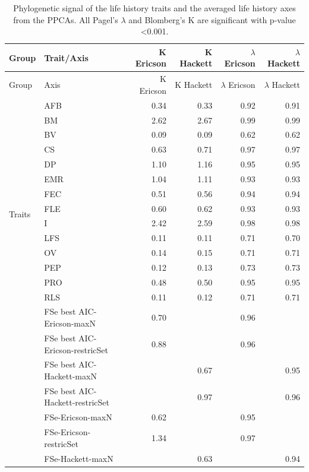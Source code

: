 \clearpage%
\begin{footnotesize}
\begin{longtable}{@{}ll|rr|rr@{}}
\caption[Phylogenetic signal]{
Phylogenetic signal of the life history traits and the averaged life history
axes from the PPCAs. All Pagel's $\lambda$ and Blomberg's K are significant with
p-value \textless{0.001}.}
\label{tab:tabApp2.7}\\

\toprule
Group & Trait/Axis & K Ericson & K Hackett & $\lambda$ Ericson & $\lambda$ Hackett\\
\midrule
\endfirsthead
\toprule
Group & Axis & K Ericson & K Hackett & $\lambda$ Ericson & $\lambda$ Hackett\\
\midrule
\endhead
\multirow{15}{*}{Traits} & AFB & 0.34 & 0.33 & 0.92 & 0.91\\
 & BM & 2.62 & 2.67 & 0.99 & 0.99\\
 & BV & 0.09 & 0.09 & 0.62 & 0.62\\
 & CS & 0.63 & 0.71 & 0.97 & 0.97\\
 & DP & 1.10 & 1.16 & 0.95 & 0.95\\
 & EMR & 1.04 & 1.11 & 0.93 & 0.93\\
 & FEC & 0.51 & 0.56 & 0.94 & 0.94\\
 & FLE & 0.60 & 0.62 & 0.93 & 0.93\\
 & I & 2.42 & 2.59 & 0.98 & 0.98\\
 & LFS & 0.11 & 0.11 & 0.71 & 0.70\\
 & OV & 0.14 & 0.15 & 0.71 & 0.71\\
 & PEP & 0.12 & 0.13 & 0.73 & 0.73\\
 & PRO & 0.48 & 0.50 & 0.95 & 0.95\\
 & RLS & 0.11 & 0.12 & 0.71 & 0.71\\
\addlinespace
\multirow{8}{*}{FSe} & FSe best AIC-Ericson-maxN & 0.70 &      & 0.96 &     \\
 & FSe best AIC-Ericson-restricSet & 0.88 &      & 0.96 &     \\
 & FSe best AIC-Hackett-maxN &      & 0.67 &      & 0.95\\
 & FSe best AIC-Hackett-restricSet &      & 0.97 &      & 0.96\\
 & FSe-Ericson-maxN & 0.62 &      & 0.95 &     \\
 & FSe-Ericson-restricSet & 1.34 &      & 0.97 &     \\
 & FSe-Hackett-maxN &      & 0.63 &      & 0.94\\

\end{longtable}
\end{footnotesize}
